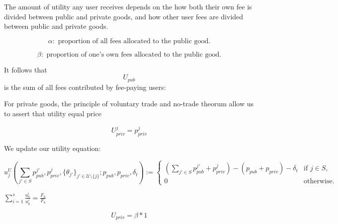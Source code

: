 \documentclass[oneside]{article}   	%
\begin{document}
The amount of utility any user receives depends on the how both their own fee is divided between public and private goods, and how other user fees are divided between public and private goods. 

\[
\alpha: \text{ proportion of all fees allocated to the public good.}
\]

\[
\beta: \text{ proportion of one's own fees allocated to the public good.}
\]

It follows that $$U_{pub}$$ is the sum of all fees contributed by fee-paying users:

For private goods, the principle of voluntary trade and no-trade theorum allow us to assert that utility equal price

$$
U_{priv}^j = p_{priv}^j
$$

We update our utility equation:

\[
u_j^U\left(\sum_{j' \in S} p_{pub}^{j'}, p_{priv}^j, \{\theta_{j'}\}_{j' \in \mathcal{U} \setminus \{j\}}; p_{pub}, p_{priv}, \delta_t\right) :=
\begin{cases}
\left(\sum_{j' \in S} p_{pub}^{j'} + p_{priv}^j\right) - (p_{pub} + p_{priv}) - \delta_t & \text{if } j \in S, \\
0 & \text{otherwise.}
\end{cases}
\]


\LARGE
\begin{adjustwidth}{1.5em}{1.5em}
\begin{math}
\sum_{i=1}^{s} \frac{u_a^i}{u_b^i} = \frac{F_a}{F_b}
\end{math}
\end{adjustwidth}
\normalsize


$$
U_{priv} = \beta * 1 
$$




\pagebreak
\end{document}
